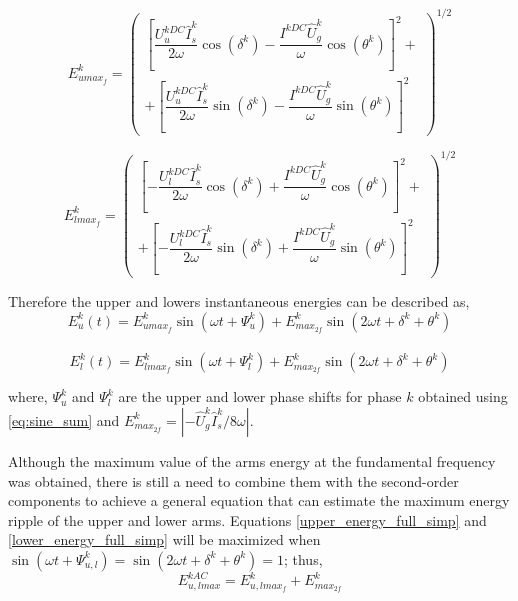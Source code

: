 \documentclass[journal]{IEEEtran}
\begin{document}
\begin{equation}
E_{umax_f}^k= \left(
\begin{aligned}
\left[\dfrac{U_u^{kDC}\hat{I}_s^k}{2\omega}\cos(\delta^k) - \dfrac{I^{kDC}\hat{U}_g^k}{\omega}\cos(\theta^k) \right]^2 + \\ 
+ \left[\dfrac{U_u^{kDC}\hat{I}_s^k}{2\omega}\sin(\delta^k) - \dfrac{I^{kDC}\hat{U}_g^k}{\omega}\sin(\theta^k) \right]^2
\end{aligned}
\right)^{1/2}
\label{Eu_f_max}
\end{equation}

\begin{equation}
E_{lmax_f}^k= \left(
\begin{aligned}
\left[-\dfrac{U_l^{kDC}\hat{I}_s^k}{2\omega}\cos(\delta^k) + \dfrac{I^{kDC}\hat{U}_g^k}{\omega}\cos(\theta^k) \right]^2 + \\ 
+ \left[-\dfrac{U_l^{kDC}\hat{I}_s^k}{2\omega}\sin(\delta^k) + \dfrac{I^{kDC}\hat{U}_g^k}{\omega}\sin(\theta^k) \right]^2
\end{aligned}
\right)^{1/2}
\label{El_f_max}
\end{equation}

Therefore the upper and lowers instantaneous energies can be described as, 
~
\begin{equation}
E_u^{k}(t) = E_{umax_f}^k \sin(\omega t + \Psi_u^k )  +  E_{max_{2f}}^k\sin(2\omega t + \delta^k + \theta^k) 
\label{upper_energy_full_simp}
\end{equation}
~
\begin{equation}
E_l^{k}(t) = E_{lmax_f}^k \sin(\omega t + \Psi_l^k )  + E_{max_{2f}}^k\sin(2\omega t + \delta^k + \theta^k) 
\label{lower_energy_full_simp}
\end{equation}

\noindent where, $\Psi_u^k$ and $\Psi_l^k$ are the upper and lower phase shifts for phase $k$ obtained using \eqref{eq:sine_sum} and $E_{max_{2f}}^k = \left|-\hat{U}_g^k \hat{I}_s^k/8\omega\right|$.

Although the maximum value of the arms energy at the fundamental frequency was obtained, there is still a need to combine them with the second-order components to achieve a general equation that can estimate the maximum energy ripple of the upper and lower arms. Equations \eqref{upper_energy_full_simp} and \eqref{lower_energy_full_simp} will be maximized when $\sin (\omega t + \Psi_{u,l}^k )= \sin (2 \omega t + \delta^k + \theta^k)=1$; thus,
~
\begin{equation}
E_{u,lmax}^{kAC} = E_{u,lmax_{f}}^k + E_{max_{2f}}^k
\label{eq:E_max_1}
\end{equation}
\end{document}
